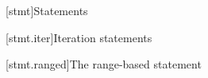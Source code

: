 
\setcounter{chapter}{5}
[stmt]{Statements}

\setcounter{section}{4}
[stmt.iter]{Iteration statements}

\setcounter{subsection}{3}
[stmt.ranged]{The range-based  statement}


